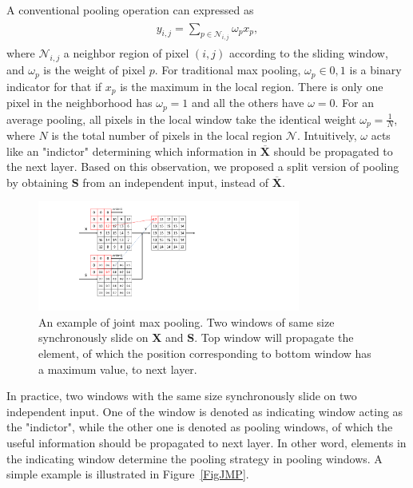 A conventional pooling operation can expressed as 
\begin{eqnarray}\label{pooling}
\begin{aligned}
y_{i,j} = \sum_{p\in \mathcal{N}_{i,j}} \omega_{p}x_{p},
\end{aligned}
\end{eqnarray}
where $\mathcal{N}_{i,j}$ a neighbor region of pixel $(i,j)$ according to the sliding window, and $\omega_{p}$ is the weight of pixel $p$.
%
For traditional max pooling, $\omega_p \in {0,1}$ is a binary indicator for that if $x_p$ is the maximum in the local region.
There is only one pixel in the neighborhood has $\omega_p=1$ and all the others have $\omega=0$.
%
For an average pooling, all pixels in the local window take the identical weight $\omega_p=\frac{1}{N}$, where $N$ is the total number of pixels in the local region $\mathcal{N}$.
%
Intuitively, $\omega$ acts like an "indictor" determining which information in $\mathbf{\overline{X}}$ should be propagated to the next layer.
Based on this observation, we proposed a split version of pooling by obtaining $\mathbf{S}$ from an independent input, instead of $\mathbf{\overline{X}}$.
\begin{figure}\label{FigJMP}
\begin{center}
\includegraphics[width=3.4in]{figures/Fig3.pdf}
\end{center}
   \caption{An example of joint max pooling.
   Two windows of same size synchronously slide on $\mathbf{X}$ and $\mathbf{S}$.
   Top window will propagate the element, of which the position corresponding to bottom window has a maximum value, to next layer.
   }
\label{F3}
\end{figure}



In practice, two windows with the same size synchronously slide on two independent input.
One of the window is denoted as indicating window acting as the "indictor", while the other one is denoted as pooling windows, of which the useful information should be propagated to next layer.
In other word, elements in the indicating window determine the pooling strategy in pooling windows.
A simple example is illustrated in Figure~\ref{FigJMP}.


